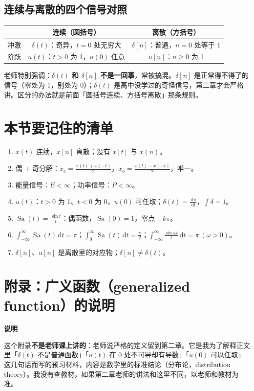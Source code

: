 \documentclass[UTF8,a4paper,11pt]{ctexart}
\newenvironment{note}{\begin{notebox}\textbf{说明}\par\smallskip}{\end{notebox}}
\newcommand{\Sa}{\operatorname{Sa}}
\renewcommand{\d}{\,\mathrm{d}}
\begin{document}
\subsection{连续与离散的四个信号对照}
\begin{center}
\begin{tabular}{lcc}
\toprule
 & 连续（圆括号） & 离散（方括号）\\
\midrule
冲激 & $\delta(t)$：奇异，$t=0$ 处无穷大 & $\delta[n]$：普通，$n=0$ 处等于 1\\
阶跃 & $u(t)$：$t>0$ 为 1，$u(0)$ 任意 & $u[n]$：$n\ge0$ 为 1\\
\bottomrule
\end{tabular}
\end{center}
老师特别强调：\textbf{$\delta(t)$ 和 $\delta[n]$ 不是一回事}，常被搞混。$\delta[n]$ 是正常得不得了的信号（零处为 1，别处为 0）；$\delta(t)$ 是高中没学过的奇怪信号，第二章才会严格讲。区分的办法就是前面「圆括号连续、方括号离散」那条规则。

\section{本节要记住的清单}
\begin{enumerate}[nosep]
\item $x(t)$ 连续，$x[n]$ 离散；没有 $x[t]$ 与 $x(n)$。
\item 偶 $+$ 奇分解：$x_e=\frac{x(t)+x(-t)}2$，$x_o=\frac{x(t)-x(-t)}2$，唯一。
\item 能量信号：$E<\infty$；功率信号：$P<\infty$。
\item $u(t)$：$t>0$ 为 1、$t<0$ 为 0，$u(0)$ 可任取；$\delta(t)=\frac{\d u}{\d t}$，$\int\delta=1$。
\item $\Sa(t)=\frac{\sin t}{t}$：偶函数，$\Sa(0)=1$，零点 $\pm k\pi$。
\item $\int_{-\infty}^{\infty}\Sa(t)\d t=\pi$；$\int_0^{\infty}\Sa(t)\d t=\frac\pi2$；$\int_{-\infty}^{\infty}\frac{\sin\omega t}{t}\d t=\pi\ (\omega>0)$。
\item $\delta[n]$、$u[n]$ 是离散里的对应物；$\delta[n]\neq\delta(t)$。
\end{enumerate}

\appendix
\section{附录：广义函数（generalized function）的说明}

\begin{note}
这个附录\textbf{不是老师课上讲的}：老师说严格的定义留到第二章。它是我为了解释正文里「$\delta(t)$ 不是普通函数」「$u(t)$ 在 $0$ 处不可导却有导数」「$u(0)$ 可以任取」这几句话而写的预习材料，内容是数学里的标准结论（分布论，distribution theory）。我没有查教材，如果第二章老师的讲法和这里不同，以老师和教材为准。
\end{note}
\end{document}
